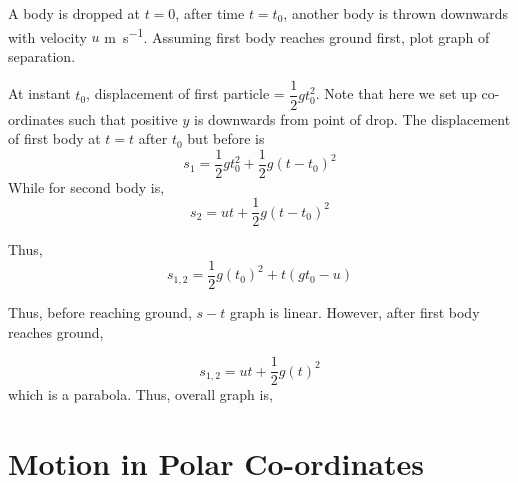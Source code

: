 \begin{example}
    A body is dropped at \(t = 0\), after time \(t = t_0\), another body is thrown downwards with
    velocity \(u\) \unit{\meter\per\second}. Assuming first body reaches ground first, plot graph
    of separation.

    \begin{soln}
        At instant \(t_0\), displacement of first particle = \(\dfrac{1}{2}gt_{0}^2\). Note that here
        we set up co-ordinates such that positive \(y\) is downwards from point of drop. The displacement 
        of first body at \(t = t\) after \(t_0\) but before  is
        \begin{equation}
            s_1 = \frac{1}{2}gt_{0}^2 + \frac{1}{2}g(t-t_0)^2
        \end{equation}
        While for second body is,
        \begin{equation}
            s_2 = ut + \frac{1}{2}g(t-t_0)^2
        \end{equation}

        Thus, 
        \begin{equation}
            s_{1,2} = \frac{1}{2}g(t_0)^2 + t(gt_0 - u)
        \end{equation}

        Thus, before reaching ground, \(s-t\) graph is linear. However, after first body reaches ground,

        \begin{equation}
            s_{1,2} = ut + \frac{1}{2}g(t)^2
        \end{equation}
        which is a parabola. Thus, overall graph is,
        \begin{figure}[H]
            \centering
        \end{figure}
    \end{soln}
\end{example}

\section{Motion in Polar Co-ordinates}

